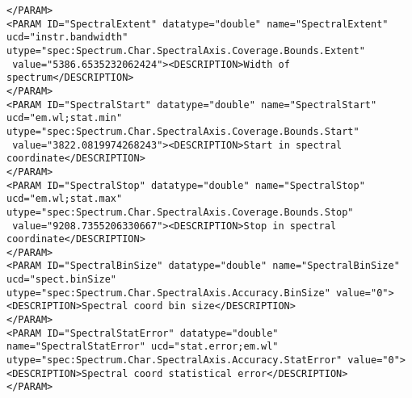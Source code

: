 \begin{landscape}
{\begin{flushleft}
\begin{fmlpage}
\begin{verbatim}
</PARAM>
<PARAM ID="SpectralExtent" datatype="double" name="SpectralExtent" ucd="instr.bandwidth" utype="spec:Spectrum.Char.SpectralAxis.Coverage.Bounds.Extent" 
 value="5386.6535232062424"><DESCRIPTION>Width of spectrum</DESCRIPTION>
</PARAM>
<PARAM ID="SpectralStart" datatype="double" name="SpectralStart" ucd="em.wl;stat.min" utype="spec:Spectrum.Char.SpectralAxis.Coverage.Bounds.Start"
 value="3822.0819974268243"><DESCRIPTION>Start in spectral coordinate</DESCRIPTION>
</PARAM>
<PARAM ID="SpectralStop" datatype="double" name="SpectralStop" ucd="em.wl;stat.max" utype="spec:Spectrum.Char.SpectralAxis.Coverage.Bounds.Stop" 
 value="9208.7355206330667"><DESCRIPTION>Stop in spectral coordinate</DESCRIPTION>
</PARAM>
<PARAM ID="SpectralBinSize" datatype="double" name="SpectralBinSize" ucd="spect.binSize" utype="spec:Spectrum.Char.SpectralAxis.Accuracy.BinSize" value="0">
<DESCRIPTION>Spectral coord bin size</DESCRIPTION>
</PARAM>
<PARAM ID="SpectralStatError" datatype="double" name="SpectralStatError" ucd="stat.error;em.wl" utype="spec:Spectrum.Char.SpectralAxis.Accuracy.StatError" value="0">
<DESCRIPTION>Spectral coord statistical error</DESCRIPTION>
</PARAM>
\end{verbatim}
\end{fmlpage}

\begin{fmlpage}
\begin{verbatim}


\end{verbatim}
\end{fmlpage}
\end{flushleft}}
\end{landscape}

